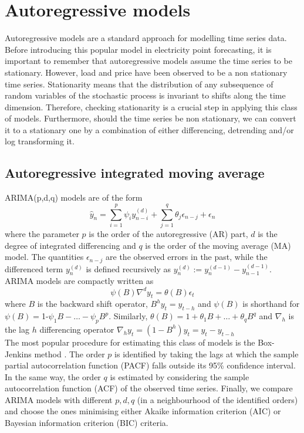 \section{Autoregressive models}
Autoregressive models are a standard approach for modelling time series data.
Before introducing this popular model in electricity point forecasting, it is important to remember that autoregressive models assume the time series to be stationary. However, load and price have been observed to be a non stationary time series. 
Stationarity means that the distribution of any subsequence of random variables of the stochastic process is invariant to shifts along the time dimension.
Therefore, checking stationarity is a crucial step in applying this class of models. %
Furthermore, should the time series be non stationary, we can convert it to a stationary one by a combination of either differencing, detrending and/or log transforming it.
\subsection{Autoregressive integrated moving average}
ARIMA(p,d,q) models are of the form
\begin{equation}
    \hat{y}_n=\sum\limits_{i=1}^{p}\psi_i y_{n-i}^{(d)}+\sum\limits_{j=1}^{q}\theta_j \epsilon_{n-j}+\epsilon_n
\end{equation}
where the parameter $p$ is the order of the autoregressive (AR) part, $d$ is the degree of integrated differencing and $q$ is the order of the moving average (MA) model. The quantities $\epsilon_{n-j}$ are the observed errors in the past, while the differenced term $y_n^{(d)}$ is defined recursively as $y_n^{(d)}:=y_n^{(d-1)}-y_{n-1}^{(d-1)}$.
\\
ARIMA models are compactly written as
\begin{equation}
    \psi(B)\nabla^d y_t=\theta(B)\epsilon_t
\end{equation}
where $B$ is the backward shift operator, $B^h y_t=y_{t-h}$ and $\psi(B)$ is shorthand for $\psi(B)=$1-$\psi_1B-\dots-\psi_p B^p$.
Similarly, $\theta(B)=1+\theta_1B+\dots+\theta_q B^q$ and $\nabla_h$ is the lag $h$ differencing operator $\nabla_h y_t=(1-B^h)y_t=y_t-y_{t-h}$
\\
The most popular procedure for estimating this class of models is the Box-Jenkins method \cite{box2015time}.
The order $p$ is identified by taking the lags at which the sample partial autocorrelation function (PACF) falls outside its 95\% confidence interval.
In the same way, the order $q$ is estimated by considering the sample autocorrelation function (ACF) of the observed time series. Finally, we compare ARIMA models with different $p,d,q$ (in a neighbourhood of the identified orders) and choose the ones minimising either Akaike information criterion (AIC) or Bayesian information criterion (BIC) criteria. 

